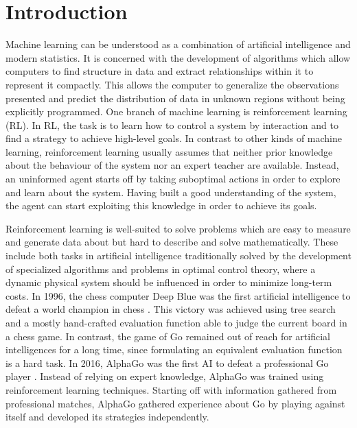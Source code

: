 \chapter{Introduction}
Machine learning can be understood as a combination of artificial intelligence and modern statistics.
It is concerned with the development of algorithms which allow computers to find structure in data and extract relationships within it to represent it compactly.
This allows the computer to generalize the observations presented and predict the distribution of data in unknown regions without being explicitly programmed.
One branch of machine learning is reinforcement learning (RL).
In RL, the task is to learn how to control a system by interaction and to find a strategy to achieve high-level goals.
In contrast to other kinds of machine learning, reinforcement learning usually assumes that neither prior knowledge about the behaviour of the system nor an expert teacher are available.
Instead, an uninformed agent starts off by taking suboptimal actions in order to explore and learn about the system.
Having built a good understanding of the system, the agent can start exploiting this knowledge in order to achieve its goals.

Reinforcement learning is well-suited to solve problems which are easy to measure and generate data about but hard to describe and solve mathematically.
These include both tasks in artificial intelligence traditionally solved by the development of specialized algorithms and problems in optimal control theory, where a dynamic physical system should be influenced in order to minimize long-term costs.
In 1996, the chess computer Deep Blue was the first artificial intelligence to defeat a world champion in chess \cite{hsu_behind_2002}.
This victory was achieved using tree search and a mostly hand-crafted evaluation function able to judge the current board in a chess game.
In contrast, the game of Go remained out of reach for artificial intelligences for a long time, since formulating an equivalent evaluation function is a hard task.
In 2016, AlphaGo was the first AI to defeat a professional Go player \cite{silver_mastering_2016}.
Instead of relying on expert knowledge, AlphaGo was trained using reinforcement learning techniques.
Starting off with information gathered from professional matches, AlphaGo gathered experience about Go by playing against itself and developed its strategies independently.

